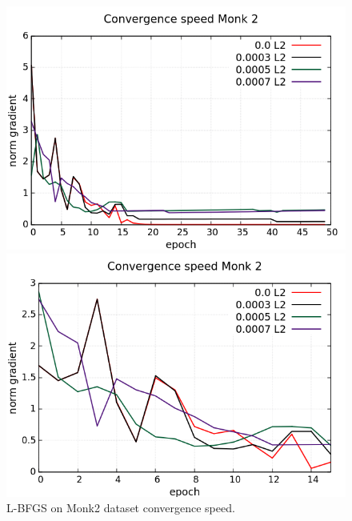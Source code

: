 \begin{figure}[H]
	\centering
	\begin{minipage}[t]{0.5\linewidth}
		\includegraphics[width=\linewidth]{data/LBFGS/Monk2/Monk2_LBFGS_CS_standard.png}
	\end{minipage}%
	\begin{minipage}[t]{0.5\linewidth}
		\includegraphics[width=\linewidth]{data/LBFGS/Monk2/Monk2_LBFGS_CS_zoom.png}
	\end{minipage}
	\caption{L-BFGS on Monk2 dataset convergence speed.}
\end{figure}
